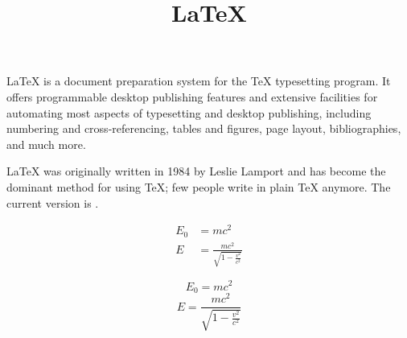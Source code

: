\documentclass[12pt]{article}
\title{\LaTeX}
\date{}
\begin{document}
  \maketitle
  \LaTeX{} is a document preparation system for
  the \TeX{} typesetting program. It offers
  programmable desktop publishing features and
  extensive facilities for automating most
  aspects of typesetting and desktop publishing,
  including numbering and  cross-referencing,
  tables and figures, page layout,
  bibliographies, and much more.
  
  \LaTeX{} was
  originally written in 1984 by Leslie Lamport
  and has become the  dominant method for using
  \TeX; few people write in plain \TeX{} anymore.
  The current version is \LaTeXe.

  \begin{align}
    E_0 &= mc^2                              \\
    E &= \frac{mc^2}{\sqrt{1-\frac{v^2}{c^2}}}
  \end{align}
  
  $$ E_0 = mc^2 $$
  $$ E = \frac{mc^2}{\sqrt{1-\frac{v^2}{c^2}}}$$
\end{document}
